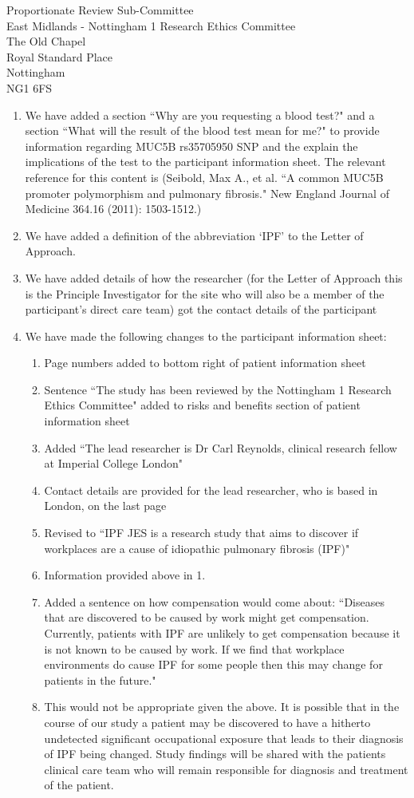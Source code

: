 \documentclass[imperial,letterpaper,pagesize,UScommercial9]{scrlttr2}
\begin{document}
\begin{letter}{    
    Proportionate Review Sub-Committee \\        
    East Midlands - Nottingham 1 Research Ethics Committee \\
    The Old Chapel \\
    Royal Standard Place \\
    Nottingham \\
    NG1 6FS}
    \begin{enumerate}[]
        \item We have added a section ``Why are you requesting a blood test?" and a section ``What will the result of the blood test mean for me?" to provide information regarding MUC5B rs35705950 SNP and the explain the implications of the test to the participant information sheet. The relevant reference for this content is (Seibold, Max A., et al. ``A common MUC5B promoter polymorphism and pulmonary fibrosis." New England Journal of Medicine 364.16 (2011): 1503-1512.)
        \item We have added a definition of the abbreviation `IPF' to the Letter of Approach.
        \item We have added details of how the researcher (for the Letter of Approach this is the Principle Investigator for the site who will also be a member of the participant's direct care team) got the contact details of the participant
        \item We have made the following changes to the participant information sheet:
        \begin{enumerate}[label=(\alph*)]
            \item Page numbers added to bottom right of patient information sheet
            \item Sentence ``The study has been reviewed by the Nottingham 1 Research Ethics Committee" added to risks and benefits section of patient information sheet
            \item Added ``The lead researcher is Dr Carl Reynolds, clinical research fellow at Imperial College London"      
            \item Contact details are provided for the lead researcher, who is based in London, on the last page
            \item Revised to ``IPF JES is a research study that aims to discover if workplaces are a cause of idiopathic pulmonary fibrosis (IPF)"
            \item Information provided above in 1.
            \item Added a sentence on how compensation would come about:
                ``Diseases that are discovered to be caused by work might get compensation. Currently, patients with IPF are unlikely to get compensation because it is not known to be caused by work. If we find that workplace environments do cause IPF for some people then this may change for patients in the future."
            \item This would not be appropriate given the above. It is possible that in the course of our study a patient may be discovered to have a hitherto undetected significant occupational exposure that leads to their diagnosis of IPF being changed. Study findings will be shared with the patients clinical care team who will remain responsible for diagnosis and treatment of the patient.

\end{enumerate}
\end{enumerate}
\end{letter}
\end{document}
